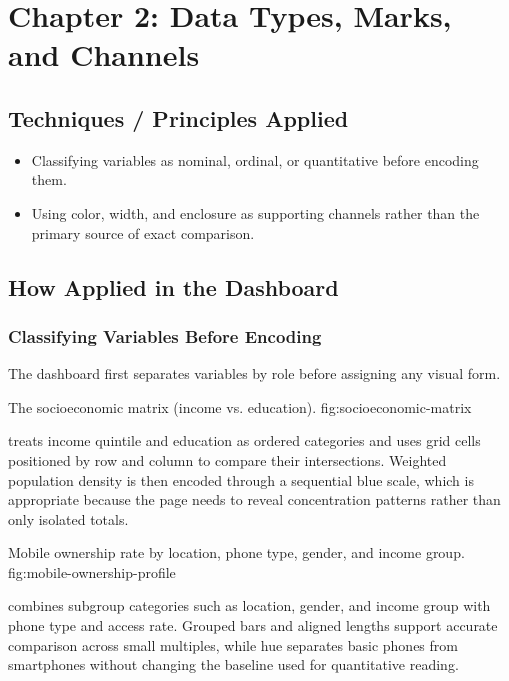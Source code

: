 \documentclass[../main.tex]{subfiles}
\begin{document}
\section{Chapter 2: Data Types, Marks, and Channels}
\label{sec:chapter2-marks-channels}

\subsection{Techniques / Principles Applied}

\begin{itemize}[leftmargin=*]
\item Classifying variables as nominal, ordinal, or quantitative before
encoding them.
\item Using color, width, and enclosure as supporting channels rather than the
primary source of exact comparison.
\end{itemize}

\subsection{How Applied in the Dashboard}

\subsubsection{Classifying Variables Before Encoding}

The dashboard first separates variables by role before assigning any visual
form.

{The socioeconomic matrix (income vs. education).}
{fig:socioeconomic-matrix}

 treats income quintile
and education as ordered categories and uses grid cells positioned by row and
column to compare their intersections. Weighted population density is then
encoded through a sequential blue scale, which is appropriate because the page
needs to reveal concentration patterns rather than only isolated totals.

{Mobile ownership rate by location, phone type, gender, and income group.}
{fig:mobile-ownership-profile}

 combines
subgroup categories such as location, gender, and income group with phone type
and access rate. Grouped bars and aligned lengths support accurate comparison
across small multiples, while hue separates basic phones from smartphones
without changing the baseline used for quantitative reading.
\end{document}
